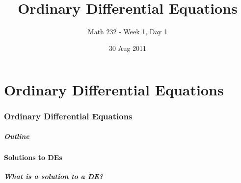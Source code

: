 

\part{Ordinary Differential Equations}
\section{Ordinary Differential Equations}

\title{Ordinary Differential Equations}
\subtitle{Math 232 - Week 1, Day 1}
\date{30 Aug 2011}

\begin{frame}
  \titlepage
\end{frame}

\begin{frame}
  \frametitle{Outline}
\end{frame}


\subsection{Solutions to DEs}


\begin{frame}
  \frametitle{What is a solution to a DE?}


\end{frame}


\begin{frame}
  \frametitle{}


\end{frame}


\begin{frame}
  \frametitle{}


\end{frame}


\begin{frame}
  \frametitle{}


\end{frame}


\begin{frame}
  \frametitle{}


\end{frame}


\begin{frame}
  \frametitle{}


\end{frame}


\begin{frame}
  \frametitle{}


\end{frame}


\begin{frame}
  \frametitle{}


\end{frame}


\begin{frame}
  \frametitle{}


\end{frame}



